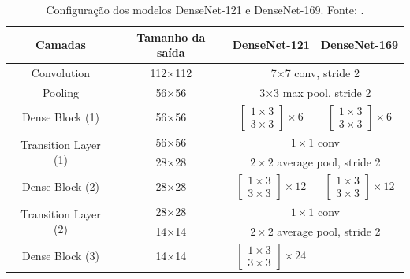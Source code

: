 \begin{table}[!htbp]
    \centering
    \caption{Configuração dos modelos DenseNet-121 e DenseNet-169. Fonte: .}
    \footnotesize
    \begin{tabular}{|c|c|c|c|}
        \hline
        \textbf{Camadas} & \textbf{Tamanho da saída} & \textbf{DenseNet-121} & \textbf{DenseNet-169} \\
        \hline
        Convolution & 112×112 & \multicolumn{2}{c|}{7×7 conv, stride 2} \\
        \hline
        Pooling & 56×56 & \multicolumn{2}{c|}{3×3 max pool, stride 2} \\
        \hline
        Dense Block (1) & 56×56 & 
        $\left[\begin{array}{c}
        1 \times 3 \\
        3 \times 3
        \end{array}\right] \times 6$ & 
        $\left[\begin{array}{c}
        1 \times 3 \\
        3 \times 3
        \end{array}\right] \times 6$ \\
        \hline
        \multirow{2}{*}{Transition Layer (1)} & 56×56 & \multicolumn{2}{c|}{$1 \times 1$ conv} \\
        \cline{2-4}
        & 28×28 & \multicolumn{2}{c|}{$2 \times 2$ average pool, stride 2} \\
        \hline
        Dense Block (2) & 28×28 & 
        $\left[\begin{array}{c}
        1 \times 3 \\
        3 \times 3
        \end{array}\right] \times 12$ & 
        $\left[\begin{array}{c}
        1 \times 3 \\
        3 \times 3
        \end{array}\right] \times 12$ \\
        \hline
        \multirow{2}{*}{Transition Layer (2)} & 28×28 & \multicolumn{2}{c|}{$1 \times 1$ conv} \\
        \cline{2-4}
        & 14×14 & \multicolumn{2}{c|}{$2 \times 2$ average pool, stride 2} \\
        \hline
        Dense Block (3) & 14×14 & 
        $\left[\begin{array}{c}
        1 \times 3 \\
        3 \times 3
        \end{array}\right] \times 24$ & 

\end{tabular}
\end{table}
